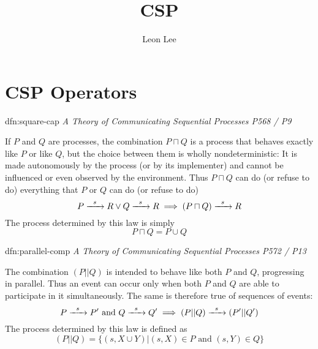 \documentclass{article}
\title{CSP}
\author{Leon Lee}
\begin{document}
\maketitle

\section{CSP Operators}

\setcounter{subsection}{1}

\begin{dfn}{dfn:square-cap}{}
    \textit{A Theory of Communicating Sequential Processes P568 / P9}

    If $P$ and $Q$ are processes, the combination $P \sqcap Q$ is a process that behaves exactly like $P$ or like $Q$, but the choice between them is wholly nondeterministic: It is made autonomously by the process (or by its implementer) and cannot be influenced or even observed by the environment. Thus $P \sqcap Q$ can do (or refuse to do) everything that $P$ or $Q$ can do (or refuse to do)
    \[P \prightarrow{s} R \vee Q \prightarrow{s} R \implies (P \sqcap Q) \prightarrow{s} R\]
    The process determined by this law is simply
    \[P \sqcap Q = P \cup Q\]
\end{dfn}

\begin{dfn}{dfn:parallel-comp}{}
    \textit{A Theory of Communicating Sequential Processes P572 / P13}

    The combination $(P | | Q)$ is intended to behave like both $P$ and $Q$, progressing in parallel. Thus an event can occur only when both $P$ and $Q$ are able to participate in it simultaneously. The same is therefore true of sequences of events:
    \[P \prightarrow{s} P' \text{ and } Q \prightarrow{s} Q' \implies (P | | Q) \prightarrow{s} (P' | | Q')\]
    The process determined by this law is defined as
    \[(P | | Q) = \{(s, X \cup Y) | (s, X) \in P \text{ and } (s, Y)\in Q\}\]
\end{dfn}
\end{document}
